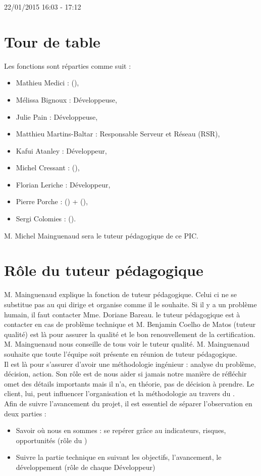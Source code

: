 \documentclass [a4paper] {article}
\begin{document}
22/01/2015			 				%
\hfill   
\hfill 	 16:03 - 17:12 				%





\section{Tour de table}
Les fonctions sont réparties comme suit :
\begin{itemize}
	\item Mathieu Medici : \RGC (\RGCCourt),
	\item Mélissa Bignoux : Développeuse,
	\item Julie Pain : Développeuse,
	\item Matthieu Martins-Baltar : Responsable Serveur et Réseau (RSR),
	\item Kafui Atanley : Développeur,
	\item Michel Cressant : \RD (\RDCourt),
	\item Florian Leriche : Développeur,
	\item Pierre Porche : \RQ (\RQCourt) + \CPA (\CPACourt),
	\item Sergi Colomies : \CP (\CPCourt).
\end{itemize}
M. Michel Mainguenaud sera le tuteur pédagogique de ce PIC.

\section{Rôle du tuteur pédagogique}
M. Mainguenaud explique la fonction de tuteur pédagogique.
Celui ci ne se substitue pas au \CP qui dirige et organise comme il le souhaite.
Si il y a un problème humain, il faut contacter Mme. Doriane Bareau. le tuteur pédagogique est à contacter en cas de problème technique et M. Benjamin Coelho de Matos (tuteur qualité) est là pour assurer la qualité et le bon renouvellement de la certification. M. Mainguenaud nous conseille de tous voir le tuteur qualité.
M. Mainguenaud souhaite que toute l'équipe soit présente en réunion de tuteur pédagogique.
\\
Il est là pour s'assurer d'avoir une méthodologie ingénieur : analyse du problème, décision, action. Son rôle est de nous aider si jamais notre manière de réfléchir omet des détails importants mais il n'a, en théorie, pas de décision à prendre.
Le client, lui, peut influencer l'organisation et la méthodologie au travers du \PQCourt .
\\
Afin de suivre l'avancement du projet, il est essentiel de séparer l'observation en deux parties :
\begin{itemize}
\item Savoir où nous en sommes : se repérer grâce au indicateurs, risques, opportunités (rôle du \RQCourt)
\item Suivre la partie technique en suivant les objectifs, l'avancement, le développement (rôle de chaque Développeur)
\end{itemize}
\end{document}

